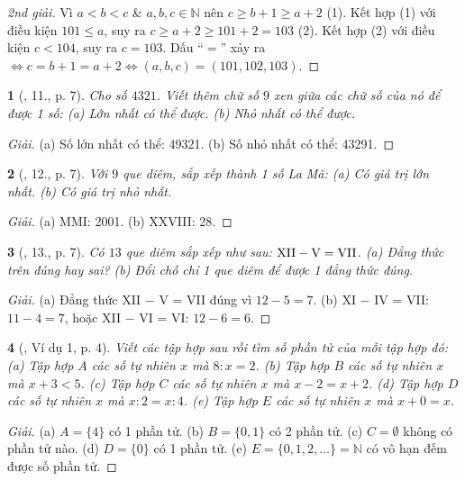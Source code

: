 \documentclass{article}
\newtheorem{baitoan}{}
\begin{document}
\begin{proof}[2nd giải]
	Vì $a < b < c$ \& $a,b,c\in\mathbb{N}$ nên $c\ge b + 1\ge a + 2$ (1). Kết hợp (1) với điều kiện $101\le a$, suy ra $c\ge a + 2\ge101 + 2 = 103$ (2). Kết hợp (2) với điều kiện $c < 104$, suy ra $c = 103$. Dấu ``$=$'' xảy ra $\Leftrightarrow c = b + 1 = a + 2\Leftrightarrow(a,b,c) = (101,102,103)$.
\end{proof}

\begin{baitoan}[\cite{Tuyen_Toan_6}, 11., p. 7]
	Cho số $4321$. Viết thêm chữ số $9$ xen giữa các chữ số của nó để được 1 số: (a) Lớn nhất có thể được. (b) Nhỏ nhất có thể được.
\end{baitoan}

\begin{proof}[Giải]
	(a) Số lớn nhất có thể: 49321. (b) Số nhỏ nhất có thể: 43291.
\end{proof}

\begin{baitoan}[\cite{Tuyen_Toan_6}, 12., p. 7]
	Với $9$ que diêm, sắp xếp thành 1 số La Mã: (a) Có giá trị lớn nhất. (b) Có giá trị nhỏ nhất.
\end{baitoan}

\begin{proof}[Giải]
	(a) MMI: 2001. (b) XXVIII: 28.
\end{proof}

\begin{baitoan}[\cite{Tuyen_Toan_6}, 13., p. 7]
	Có $13$ que diêm sắp xếp như sau: $\rm XII - V = VII$. (a) Đẳng thức trên đúng hay sai? (b) Đổi chỗ chỉ 1 que diêm để được 1 đẳng thức đúng.
\end{baitoan}

\begin{proof}[Giải]
	(a) Đẳng thức XII $-$ V = VII đúng vì $12 - 5 = 7$. (b) XI $-$ IV = VII: $11 - 4 = 7$, hoặc XII $-$ VI = VI: $12 - 6 = 6$.
\end{proof}

\begin{baitoan}[\cite{Binh_Toan_6_tap_1}, Ví dụ 1, p. 4]
	Viết các tập hợp sau rồi tìm số phần tử của mỗi tập hợp đó: (a) Tập hợp $A$ các số tự nhiên $x$ mà $8:x = 2$. (b) Tập hợp $B$ các số tự nhiên $x$ mà $x + 3 < 5$. (c) Tập hợp $C$ các số tự nhiên $x$ mà $x - 2 = x + 2$. (d) Tập hợp $D$ các số tự nhiên $x$ mà $x:2 = x:4$. (e) Tập hợp $E$ các số tự nhiên $x$ mà $x + 0 = x$.
\end{baitoan}

\begin{proof}[Giải]
	(a) $A = \{4\}$ có 1 phần tử. (b) $B = \{0,1\}$ có 2 phần tử. (c) $C = \emptyset$ không có phần tử nào. (d) $D = \{0\}$ có 1 phần tử. (e) $E = \{0,1,2,\ldots\} = \mathbb{N}$ có vô hạn đếm được số phần tử.
\end{proof}
\end{document}

